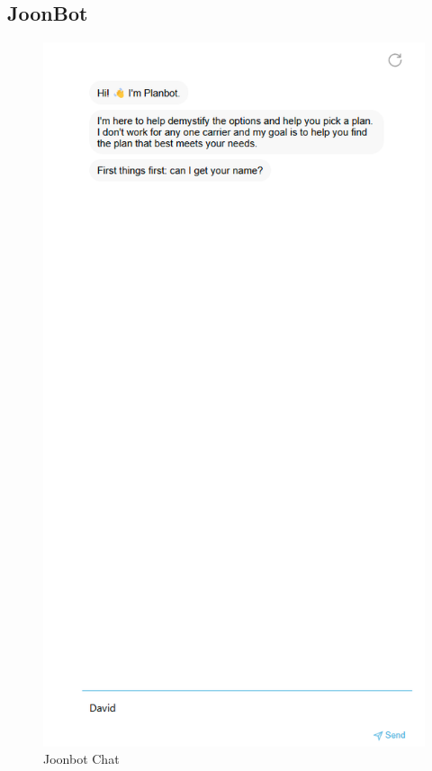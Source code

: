 \documentclass[conference]{IEEEtran}
\begin{document}
\subsection{JoonBot}
\begin{figure}[H]
    \centering
    \includegraphics[width=1\linewidth]{joonbotChat.png}
    \caption{Joonbot Chat}
    \label{fig:user flow}
\end{figure}
\end{document}
